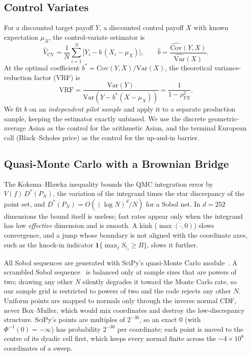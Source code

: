 \documentclass[sigconf]{acmart}
\begin{document}
\subsection{Control Variates}
\label{sec:cv-method}
For a discounted target payoff $Y$, a discounted control payoff $X$ with
known expectation $\mu_X$, the control-variate estimator is
\begin{equation}
  \hat V_{\mathrm{CV}} = \frac{1}{N}\sum_{i=1}^{N}\Big[Y_i - \hat b\,(X_i-\mu_X)\Big],
  \qquad \hat b = \frac{\widehat{\mathrm{Cov}}(Y,X)}{\widehat{\mathrm{Var}}(X)}.
  \label{eq:cv}
\end{equation}
At the optimal coefficient $b^\ast=\mathrm{Cov}(Y,X)/\mathrm{Var}(X)$, the
theoretical variance-reduction factor (VRF) is
\begin{equation}
  \mathrm{VRF} = \frac{\mathrm{Var}(Y)}{\mathrm{Var}(Y-b^\ast(X-\mu_X))} = \frac{1}{1-\rho_{YX}^2}.
  \label{eq:cv-vrf}
\end{equation}
We fit $\hat b$ on an \emph{independent pilot sample} and apply it to a
separate production sample, keeping the estimator exactly unbiased. We use
the discrete geometric-average Asian as the control for the arithmetic
Asian, and the terminal European call (Black--Scholes price) as the control
for the up-and-in barrier.

\subsection{Quasi-Monte Carlo with a Brownian Bridge}
\label{sec:qmc-method}
The Koksma--Hlawka inequality bounds the QMC integration error by
$V(f)\,D^\ast(P_N)$, the variation of the integrand times the star
discrepancy of the point set, and $D^\ast(P_N)=O((\log N)^d/N)$ for a Sobol
net. In $d=252$ dimensions the bound itself is useless; fast rates appear
only when the integrand has low \emph{effective} dimension and is smooth.
A kink ($\max(\cdot,0)$) slows convergence, and a jump whose boundary is not
aligned with the coordinate axes, such as the knock-in indicator
$\mathbf 1\{\max_j S_{t_j}\ge B\}$, slows it further.

All Sobol sequences are generated with SciPy's quasi-Monte Carlo
module~\cite{Virtanen2020}. A scrambled Sobol sequence~\cite{Owen1997} is balanced only at sample sizes
that are powers of two; drawing any other $N$ silently degrades it toward
the Monte Carlo rate, so our sample grid is restricted to powers of two and
the code rejects any other $N$.
Uniform points are mapped to normals only through the inverse normal CDF,
never Box--Muller, which would mix coordinates and destroy the
low-discrepancy structure. SciPy's points are multiples of $2^{-30}$, so an
exact $0$ (with $\Phi^{-1}(0)=-\infty$) has probability $2^{-30}$ per
coordinate; each point is moved to the centre of its dyadic cell first,
which keeps every normal finite across the $\sim\!4\times10^8$ coordinates
of a sweep.
\end{document}
